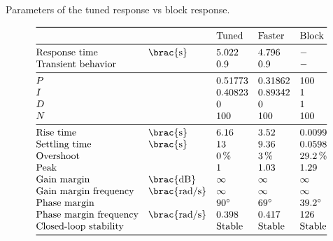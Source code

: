 \documentclass[12pt]{article}
\DeclarePairedDelimiter\brac[]%
\begin{document}
\begin{table}[]
    \centering
    \caption{Parameters of the tuned response vs block response.}
    \[
        \begin{array}{@{}*5l@{}}
            \toprule
                &
                    & \text{Tuned}
                    & \text{Faster}
                    & \text{Block} \\*
            \midrule
                \text{Response time} & \brac{\si\second}
                    & 5.022 & 4.796 & - \\*
                \text{Transient behavior} &
                    & 0.9 & 0.9 & - \\*
            \midrule
                P && 0.51773 & 0.31862 & 100 \\*
                I && 0.40823 & 0.89342 & 1 \\*
                D && 0 & 0 & 1 \\*
                N && 100 & 100 & 100 \\*
            \midrule
                \text{Rise time} & \brac{\si\second}
                    & 6.16 & 3.52 & 0.0099
                \\*
                \text{Settling time} & \brac{\si\second}
                    & 13 & 9.36 & 0.0598
                \\*
                \text{Overshoot} &
                    & \SI{0}\percent & \SI{3}\percent & \SI{29.2}\percent
                \\*
                \text{Peak} &
                    & 1 & 1.03 & 1.29
                \\*
                \text{Gain margin} & \brac{\si{\deci\bel}}
                    & \infty & \infty & \infty
                \\*
                \text{Gain margin frequency} & \brac{\si{\radian\per\second}}
                    & \infty & \infty & \infty
                \\*
                \text{Phase margin} & 
                    & \SI{90}\degree & \SI{69}\degree & \SI{39.2}\degree
                \\*
                \text{Phase margin frequency} & \brac{\si{\radian\per\second}}
                    & 0.398 & 0.417 & 126
                \\*
                \text{Closed-loop stability} &
                    & \text{Stable}
                    & \text{Stable}
                    & \text{Stable}
                \\*
            \bottomrule
        \end{array}
    \]
    \label{tab:tuned vs block reponse params}
\end{table}
\end{document}
